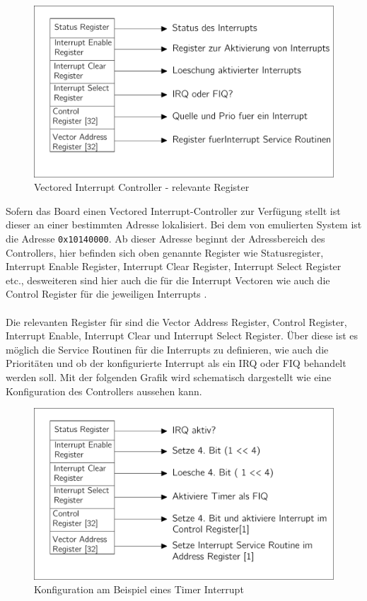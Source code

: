 \begin{figure}[H]
	\begin{center}	
	\caption{Vectored Interrupt Controller - relevante Register}
	\includegraphics[scale=0.60]{common/vic.pdf}
	\end{center}
	\label{vicSchema}
\end{figure}
\noindent
Sofern das Board einen Vectored Interrupt-Controller zur Verf\"ugung stellt ist dieser an einer bestimmten Adresse lokalisiert. Bei dem von \mops emulierten System ist die Adresse \texttt{0x10140000}\parencite[vgl.][223]{archManI}. Ab dieser Adresse beginnt der Adressbereich des Controllers, hier befinden sich oben genannte Register wie Statusregister, Interrupt Enable Register, Interrupt Clear Register, Interrupt Select Register etc., desweiteren sind hier auch die f\"ur die Interrupt Vectoren wie auch die Control Register f\"ur die jeweiligen Interrupts \parencite[vgl.][35]{vic}.\\\\
Die relevanten Register f\"ur \mops sind die Vector Address Register, Control Register, Interrupt Enable, Interrupt Clear und Interrupt Select Register. \"Uber diese ist es m\"oglich die Service Routinen f\"ur die Interrupts zu definieren, wie auch die Priorit\"aten und ob der konfigurierte Interrupt als ein IRQ oder FIQ behandelt werden soll. Mit der folgenden Grafik wird schematisch dargestellt wie eine Konfiguration des Controllers aussehen kann.
\begin{figure}[H]
	\begin{center}	
	\caption{Konfiguration am Beispiel eines Timer Interrupt}
	\includegraphics[scale=0.60]{common/vicsample.pdf}
	\end{center}
	\label{draft:vicSample}
\end{figure}
